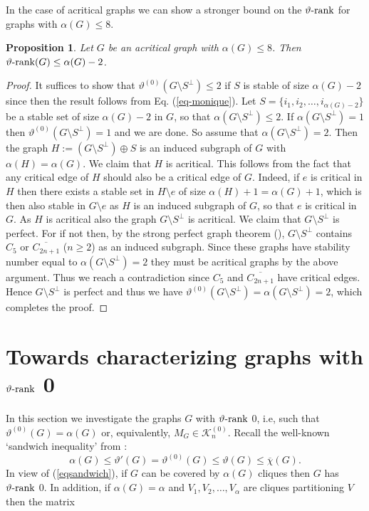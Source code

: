 \documentclass[11pt]{article}
\newtheorem{proposition}[theorem]{Proposition}
\numberwithin{equation}{section}
\newcommand{\rrank}{\vartheta\text{\rm -rank}}
\begin{document}
 In the case of acritical graphs we can show a stronger  bound on the $\rrank$ for graphs with $\alpha(G)\le 8$.

\begin{proposition}
Let $G$ be an acritical graph with $\alpha(G)\leq 8$. Then $\rrank(G)\leq \alpha(G)-2$.
\end{proposition}

\begin{proof}
It suffices to show that $\vartheta^{(0)}(G\setminus S^\perp)\leq 2$ if $S$ is stable of size $\alpha(G)-2$ since then the result follows from Eq. (\ref{eq-monique}). Let $S=\{i_1, i_2, \dots, i_{\alpha(G)-2}\}$ be a stable set of size $\alpha(G)-2$ in $G$, so that $\alpha(G\setminus S^\perp)\leq 2$. If $\alpha(G\setminus S^\perp)=1$ then $\vartheta^{(0)}(G\setminus S^\perp)=1$ and we are done. 
So assume that $\alpha(G\setminus S^\perp)=2$. Then the graph $H:=(G\setminus S^\perp)\oplus S$ is an induced subgraph of $G$ with $\alpha(H)=\alpha(G)$. We claim that $H$ is acritical. This follows from the fact that any critical edge of $H$ should also be a critical edge of $G$. Indeed,  if $e$ is critical in $H$ then there exists a stable set  in $H\setminus e$ of size $\alpha(H)+1=\alpha(G)+1$, which is then also stable in $G\setminus e$ as $H$ is an induced subgraph of $G$, so that $e$ is critical in $G$. As $H$ is acritical also  the graph $G\setminus S^\perp$ is acritical. %
We claim that $G\setminus S^\perp$ is perfect. For if not then, by the strong perfect graph theorem (\cite{SPGT}),  $G\setminus S^\perp$   contains $C_{5}$ or $\overline{C_{2n+1}}$ ($n\ge 2$)  as an induced subgraph. Since these graphs have stability number equal to $\alpha(G\setminus S^\perp)=2$ they must be acritical graphs by the above argument. Thus we reach a contradiction since $C_5$ and $\overline{C_{2n+1}}$ have critical edges.
Hence  $G\setminus S^\perp$ is perfect and thus we have $\vartheta^{(0)}(G\setminus S^\perp)=\alpha(G\setminus S^\perp)=2$, which completes the proof.
\end{proof}



\section{Towards characterizing graphs with $\rrank$ 0} \label{sec-rank-0}

In this section we investigate the graphs $G$ with $\rrank$ 0, i.e,  such that $\vartheta^{(0)}(G)=\alpha(G)$ or, equivalently, $M_G\in \mathcal K^{(0)}_n$. Recall the well-known `sandwich inequality' from \cite{Lo79}:
\begin{equation}\label{eqsandwich} 
\alpha(G)\le \vartheta'(G)=\vartheta^{(0)}(G)\le \vartheta(G)\le \overline \chi(G).
\end{equation}
In view of (\ref{eqsandwich}), if $G$ can be covered by $\alpha(G)$ cliques then $G$ has $\rrank$ 0. In addition, if $\alpha(G)=\alpha$ and $V_1, V_2, \dots, V_\alpha$ are cliques partitioning $V$ then the matrix 
\end{document}

